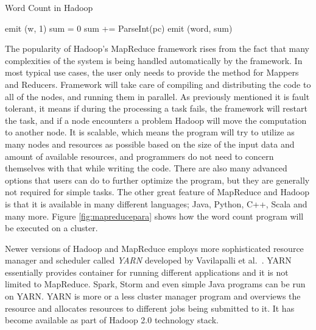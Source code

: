\documentclass[english]{tktltiki}
\begin{document}
\begin{algorithm}
\caption{Word Count in Hadoop}
\label{alg:wordcount}
\begin{algorithmic}
      		\State emit (w, 1)
   \EndFor
\EndFunction
\State 
{}
  \State sum = 0
    \State sum += ParseInt(pc)
    \State emit (word, sum)
\EndFor
\EndFunction
\end{algorithmic}
\end{algorithm}

The popularity of Hadoop's MapReduce framework rises from the fact that many complexities of the system is being handled automatically by the framework. In most typical use cases, the user only needs to provide the method for Mappers and Reducers. Framework will take care of compiling and distributing the code to all of the nodes, and running them in parallel. As previously mentioned it is fault tolerant, it means if during the processing a task fails, the framework will restart the task, and if a node encounters a problem Hadoop will move the computation to another node. It is scalable, which means the program will try to utilize as many nodes and resources as possible based on the size of the input data and amount of available resources, and programmers do not need to concern themselves with that while writing the code. There are also many advanced options that users can do to further optimize the program, but they are generally not required for simple tasks. The other great feature of MapReduce and Hadoop is that it is available in many different languages; Java, Python, C++, Scala and many more. Figure \ref{fig:mapreducepara} shows how the word count program will be executed on a cluster.

Newer versions of Hadoop and MapReduce employs more sophisticated resource manager and scheduler called \textit{YARN} developed by Vavilapalli et al.\ \cite{vavila13}. YARN essentially provides container for running different applications and it is not limited to MapReduce. Spark, Storm and even simple Java programs can be run on YARN. YARN is more or a less cluster manager program and overviews the resource and allocates resources to different jobs being submitted to it. It has become available as part of Hadoop 2.0 technology stack.
\end{document}
